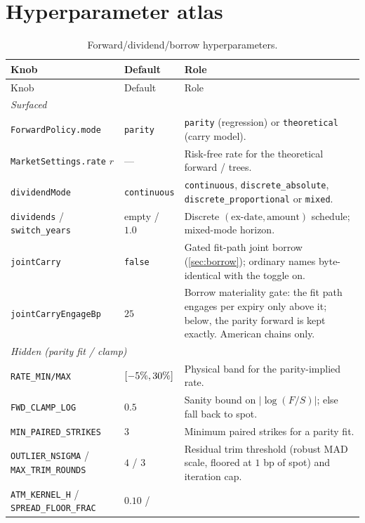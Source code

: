 \documentclass[11pt]{article}
\begin{document}
\appendix
\section{Hyperparameter atlas}
\label{app:atlas}

\begin{longtable}{p{}p{}p{}}
\caption{Forward/dividend/borrow hyperparameters.}\label{tab:atlas}\\
\toprule Knob & Default & Role\\ \midrule
\endfirsthead \toprule Knob & Default & Role\\ \midrule \endhead
\multicolumn{3}{l}{\emph{Surfaced}}\\ \midrule
\texttt{ForwardPolicy.mode} & \texttt{parity} & \texttt{parity}
(regression) or \texttt{theoretical} (carry model).\\
\texttt{MarketSettings.rate} $r$ & --- & Risk-free rate for the
theoretical forward / trees.\\
\texttt{dividendMode} & \texttt{continuous} & \texttt{continuous},
\texttt{discrete\_absolute}, \texttt{discrete\_proportional} or
\texttt{mixed}.\\
\texttt{dividends} / \texttt{switch\_years} & empty / $1.0$ & Discrete
$(\text{ex-date},\text{amount})$ schedule; mixed-mode horizon.\\
\texttt{jointCarry} & \texttt{false} & Gated fit-path joint borrow
(\cref{sec:borrow}); ordinary names byte-identical with the toggle on.\\
\texttt{jointCarryEngageBp} & $25$ & Borrow materiality gate: the fit path
engages per expiry only above it; below, the parity forward is kept
exactly.  American chains only.\\
\midrule
\multicolumn{3}{l}{\emph{Hidden (parity fit / clamp)}}\\ \midrule
\texttt{RATE\_MIN/MAX} & $[-5\%,30\%]$ & Physical band
for the parity-implied rate.\\
\texttt{FWD\_CLAMP\_LOG} & $0.5$ & Sanity bound on $|\log(F/S)|$; else
fall back to spot.\\
\texttt{MIN\_PAIRED\_STRIKES} & $3$ & Minimum paired strikes for a parity
fit.\\
\texttt{OUTLIER\_NSIGMA} / \texttt{MAX\_TRIM\_ROUNDS} & $4$ / $3$ &
Residual trim threshold (robust MAD scale, floored at $1$ bp of spot) and
iteration cap.\\
\texttt{ATM\_KERNEL\_H} / \texttt{SPREAD\_FLOOR\_FRAC} & $0.10$ /

\end{longtable}
\end{document}
